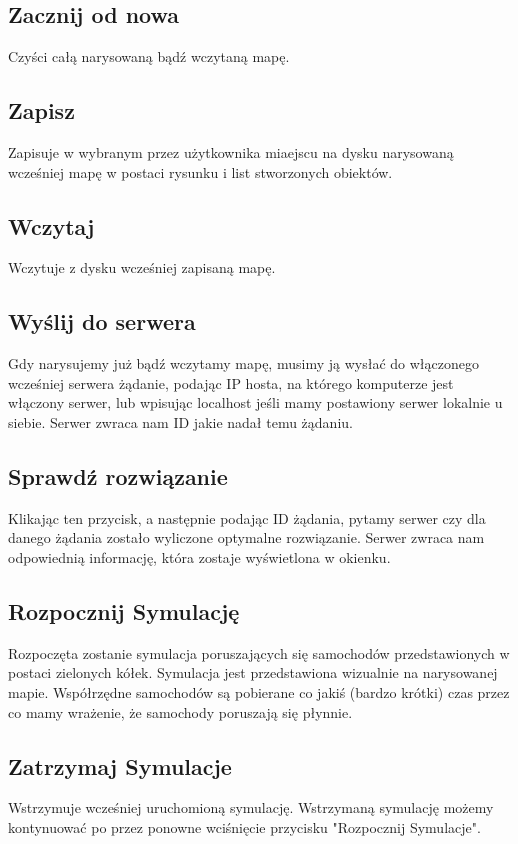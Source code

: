 \documentclass{article}
\begin{document}
\subsection{Zacznij od nowa}
    Czyści całą narysowaną bądź wczytaną mapę.

\subsection{Zapisz}
    Zapisuje w wybranym przez użytkownika miaejscu na dysku narysowaną wcześniej mapę w postaci rysunku i list stworzonych obiektów.

\subsection{Wczytaj}
    Wczytuje z dysku wcześniej zapisaną mapę.

\subsection{Wyślij do serwera}
    Gdy narysujemy już bądź wczytamy mapę, musimy ją wysłać do włączonego wcześniej serwera żądanie, podając IP hosta, na którego komputerze jest włączony serwer, lub wpisując localhost jeśli mamy postawiony serwer lokalnie u siebie. Serwer zwraca nam ID jakie nadał temu żądaniu.

\subsection{Sprawdź rozwiązanie}
    Klikając ten przycisk, a następnie podając ID żądania, pytamy serwer czy dla danego żądania zostało wyliczone optymalne rozwiązanie. Serwer zwraca nam odpowiednią informację, która zostaje wyświetlona w okienku.

\subsection{Rozpocznij Symulację}
    Rozpoczęta zostanie symulacja poruszających się samochodów przedstawionych w postaci zielonych kółek. Symulacja jest przedstawiona wizualnie na narysowanej mapie. Współrzędne samochodów są pobierane co jakiś (bardzo krótki) czas przez co mamy wrażenie, że samochody poruszają się płynnie.

\subsection{Zatrzymaj Symulacje}
    Wstrzymuje wcześniej uruchomioną symulację. Wstrzymaną symulację możemy kontynuować po przez ponowne wciśnięcie przycisku "Rozpocznij Symulacje".
\end{document}
